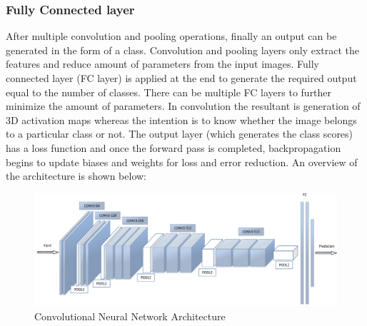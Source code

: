 \documentclass[11pt]{article}
\begin{document}
\subsubsection{Fully Connected layer}
After multiple convolution and pooling operations, finally an output can be generated in the form of a class. Convolution and pooling layers only extract the features and reduce amount of parameters from the input images. Fully connected layer (FC layer) is applied at the end to generate the required output equal to the number of classes. There can be multiple FC layers to further minimize the amount of parameters. In convolution the resultant is generation of 3D activation maps whereas the intention is to know whether the image belongs to a particular class or not. The output layer (which generates the class scores) has a loss function and once the forward pass is completed, backpropagation begins to update biases and weights for loss and error reduction. An overview of the architecture is shown below:

\begin{figure}[H]
	\centering
	\includegraphics[width=.6\linewidth]{files/cnn_architecture/arch.png}
	\caption{Convolutional Neural Network Architecture \cite{2016face}}
	\label{fig: CNN architecture}
\end{figure}
\end{document}
